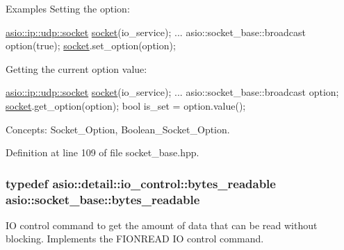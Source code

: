 \begin{DoxyParagraph}{Examples}
Setting the option\+: 
\begin{DoxyCode}
\hyperlink{classasio_1_1basic__datagram__socket}{asio::ip::udp::socket} \hyperlink{namespacewebsocketpp_1_1transport_1_1asio_1_1socket_1_1error_a828ddaa5ed63a761e1b557465a35f05aa0c31b356014843e1d09514e794a539a7}{socket}(io\_service); 
...
asio::socket\_base::broadcast option(\textcolor{keyword}{true});
\hyperlink{namespacewebsocketpp_1_1transport_1_1asio_1_1socket_1_1error_a828ddaa5ed63a761e1b557465a35f05aa0c31b356014843e1d09514e794a539a7}{socket}.set\_option(option);
\end{DoxyCode}

\end{DoxyParagraph}
\begin{DoxyParagraph}{}
Getting the current option value\+: 
\begin{DoxyCode}
\hyperlink{classasio_1_1basic__datagram__socket}{asio::ip::udp::socket} \hyperlink{namespacewebsocketpp_1_1transport_1_1asio_1_1socket_1_1error_a828ddaa5ed63a761e1b557465a35f05aa0c31b356014843e1d09514e794a539a7}{socket}(io\_service); 
...
asio::socket\_base::broadcast option;
\hyperlink{namespacewebsocketpp_1_1transport_1_1asio_1_1socket_1_1error_a828ddaa5ed63a761e1b557465a35f05aa0c31b356014843e1d09514e794a539a7}{socket}.get\_option(option);
\textcolor{keywordtype}{bool} is\_set = option.value();
\end{DoxyCode}

\end{DoxyParagraph}
\begin{DoxyParagraph}{Concepts\+:}
Socket\+\_\+\+Option, Boolean\+\_\+\+Socket\+\_\+\+Option. 
\end{DoxyParagraph}


Definition at line 109 of file socket\+\_\+base.\+hpp.

\hypertarget{classasio_1_1socket__base_acf399372b78fa9a6ad04a297202c2fac}{}
\subsubsection[{bytes\+\_\+readable}]{\setlength{\rightskip}{0pt plus 5cm}typedef {\bf asio\+::detail\+::io\+\_\+control\+::bytes\+\_\+readable} {\bf asio\+::socket\+\_\+base\+::bytes\+\_\+readable}}\label{classasio_1_1socket__base_acf399372b78fa9a6ad04a297202c2fac}
I\+O control command to get the amount of data that can be read without blocking. Implements the F\+I\+O\+N\+R\+E\+A\+D I\+O control command.

